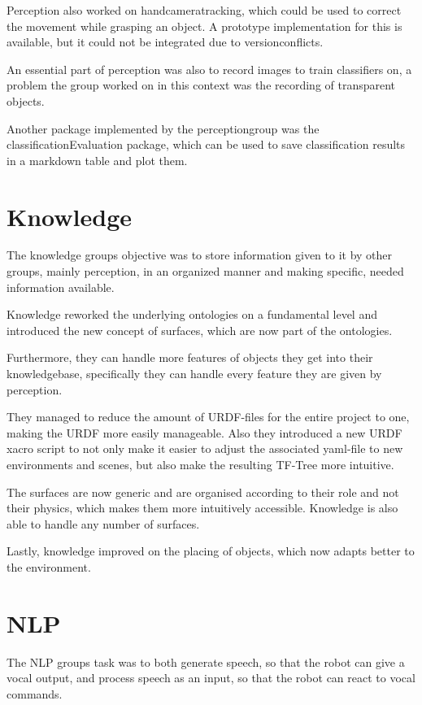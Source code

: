 \documentclass[main.tex]{subfiles}
\begin{document}
		Perception also worked on handcameratracking, which could be used to correct the movement while grasping an object. A prototype implementation for this is available, but it could not be integrated due to versionconflicts. 
		
		An essential part of perception was also to record images to train classifiers on, a problem the group worked on in this context was the recording of transparent objects.
		
		Another package implemented by the perceptiongroup was the classificationEvaluation package, which can be used to save classification results in a markdown table and plot them.
		
		
		
		
		\section{Knowledge}
		The knowledge groups objective was to store information given to it by other groups, mainly perception, in an organized manner and making specific, needed information available.
		
		Knowledge reworked the underlying ontologies on a fundamental level and introduced the new concept of surfaces, which are now part of the ontologies.
		
		Furthermore, they can handle more features of objects they get into their knowledgebase, specifically they can handle every feature they are given by perception.
		
		They managed to reduce the amount of URDF-files for the entire project to one, making the URDF more easily manageable.  Also they introduced a new URDF xacro script to not only make it easier to adjust the associated yaml-file to new environments and scenes, but also make the resulting TF-Tree more intuitive.
		
		The surfaces are now generic and are organised according to their role and not their physics, which makes them more intuitively accessible. Knowledge is also able to handle any number of surfaces.
		
		Lastly, knowledge improved on the placing of objects, which now adapts better to the environment. 		
		\section{NLP}
		The NLP groups task was to both generate speech, so that the robot can give a vocal output, and process speech as an input, so that the robot can react to vocal commands.
		
\end{document}
